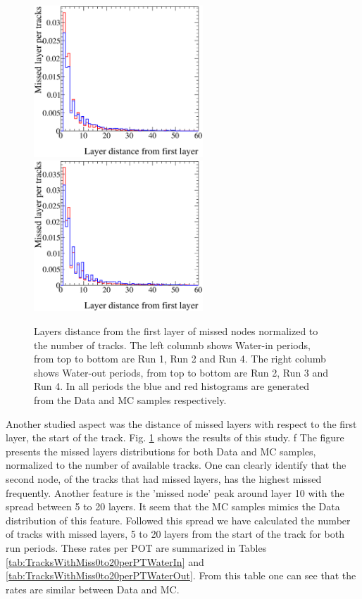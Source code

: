 \begin{figure}
\includegraphics[width=2.5in]{Figures/layerEff-5F5E-Run4-ccinc-DoMC-MissedLayerPerTracks.eps}
\includegraphics[width=2.5in]{Figures/layerEff-5F5E-Run4air-ccinc-DoMC-MissedLayerPerTracks.eps}
\caption{Layers distance from the first layer of missed nodes normalized 
to the number of tracks. 
The left columnb shows Water-in periods, from top to bottom 
are Run 1, Run 2 and Run 4.  
The right columb shows Water-out periods, from top to bottom 
are Run 2, Run 3 and Run 4.
In all periods 
the blue and red histograms are generated from the Data and MC samples
respectively.
}
\label{fig:MisssedNodePerTracks}
\end{figure}

Another studied aspect 
was 
the distance of missed layers with respect to 
the first layer, the start of the track.
Fig. \ref{fig:MisssedNodePerTracks} shows the results of this study. 
f%
The figure presents the 
missed layers distributions for both  
Data and MC samples, normalized to the number of available tracks.
One can clearly identify that the second node, 
of the tracks that had missed layers, 
has the highest missed frequently. 
Another feature is the 'missed node' peak around layer 10 with 
the spread between 5 to 20 layers. 
It seem that the MC samples mimics the Data distribution 
of this feature.
Followed this spread we have calculated the number of tracks 
with missed layers, 5 to 20 layers from the start of the track 
for both run periods. 
These rates per POT are summarized 
in Tables \ref{tab:TracksWithMiss0to20perPTWaterIn} 
and \ref{tab:TracksWithMiss0to20perPTWaterOut}.
From this table one can see that the rates are similar 
between Data and MC. \\


